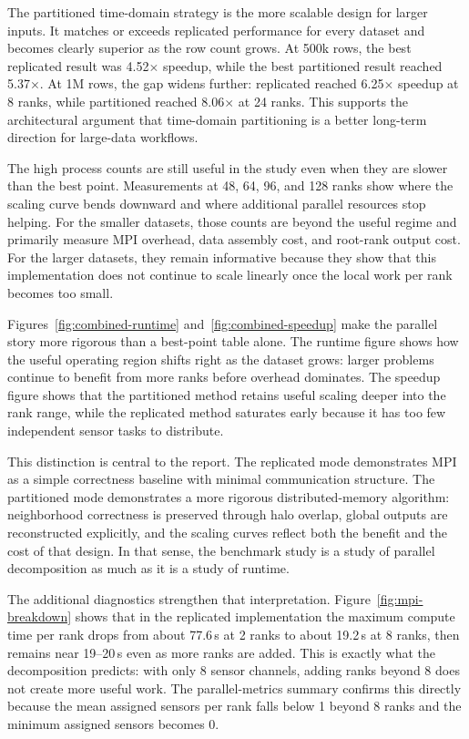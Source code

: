 \documentclass[11pt]{article}
\begin{document}
The partitioned time-domain strategy is the more scalable design for larger inputs. It matches or exceeds replicated performance for every dataset and becomes clearly superior as the row count grows. At 500k rows, the best replicated result was 4.52$\times$ speedup, while the best partitioned result reached 5.37$\times$. At 1M rows, the gap widens further: replicated reached 6.25$\times$ speedup at 8 ranks, while partitioned reached 8.06$\times$ at 24 ranks. This supports the architectural argument that time-domain partitioning is a better long-term direction for large-data workflows.

The high process counts are still useful in the study even when they are slower than the best point. Measurements at 48, 64, 96, and 128 ranks show where the scaling curve bends downward and where additional parallel resources stop helping. For the smaller datasets, those counts are beyond the useful regime and primarily measure MPI overhead, data assembly cost, and root-rank output cost. For the larger datasets, they remain informative because they show that this implementation does not continue to scale linearly once the local work per rank becomes too small.

Figures~\ref{fig:combined-runtime} and~\ref{fig:combined-speedup} make the parallel story more rigorous than a best-point table alone. The runtime figure shows how the useful operating region shifts right as the dataset grows: larger problems continue to benefit from more ranks before overhead dominates. The speedup figure shows that the partitioned method retains useful scaling deeper into the rank range, while the replicated method saturates early because it has too few independent sensor tasks to distribute.

This distinction is central to the report. The replicated mode demonstrates MPI as a simple correctness baseline with minimal communication structure. The partitioned mode demonstrates a more rigorous distributed-memory algorithm: neighborhood correctness is preserved through halo overlap, global outputs are reconstructed explicitly, and the scaling curves reflect both the benefit and the cost of that design. In that sense, the benchmark study is a study of parallel decomposition as much as it is a study of runtime.

The additional diagnostics strengthen that interpretation. Figure~\ref{fig:mpi-breakdown} shows that in the replicated implementation the maximum compute time per rank drops from about 77.6\,s at 2 ranks to about 19.2\,s at 8 ranks, then remains near 19--20\,s even as more ranks are added. This is exactly what the decomposition predicts: with only 8 sensor channels, adding ranks beyond 8 does not create more useful work. The parallel-metrics summary confirms this directly because the mean assigned sensors per rank falls below 1 beyond 8 ranks and the minimum assigned sensors becomes 0.
\end{document}
